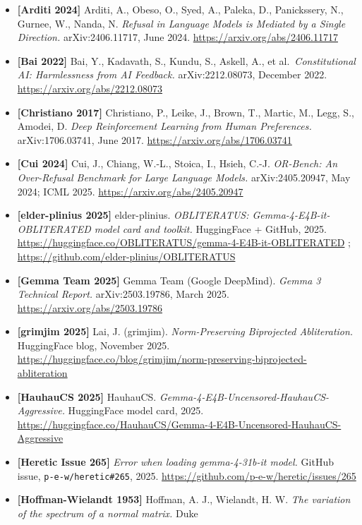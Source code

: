 \documentclass[
  11pt,
]{article}
\begin{document}
\begin{itemize}
\item
  \textbf{{[}Arditi 2024{]}} Arditi, A., Obeso, O., Syed, A., Paleka,
  D., Panickssery, N., Gurnee, W., Nanda, N. \emph{Refusal in Language
  Models is Mediated by a Single Direction.} arXiv:2406.11717, June
  2024. \url{https://arxiv.org/abs/2406.11717}
\item
  \textbf{{[}Bai 2022{]}} Bai, Y., Kadavath, S., Kundu, S., Askell, A.,
  et al.~\emph{Constitutional AI: Harmlessness from AI Feedback.}
  arXiv:2212.08073, December 2022.
  \url{https://arxiv.org/abs/2212.08073}
\item
  \textbf{{[}Christiano 2017{]}} Christiano, P., Leike, J., Brown, T.,
  Martic, M., Legg, S., Amodei, D. \emph{Deep Reinforcement Learning
  from Human Preferences.} arXiv:1706.03741, June 2017.
  \url{https://arxiv.org/abs/1706.03741}
\item
  \textbf{{[}Cui 2024{]}} Cui, J., Chiang, W.-L., Stoica, I., Hsieh,
  C.-J. \emph{OR-Bench: An Over-Refusal Benchmark for Large Language
  Models.} arXiv:2405.20947, May 2024; ICML 2025.
  \url{https://arxiv.org/abs/2405.20947}
\item
  \textbf{{[}elder-plinius 2025{]}} elder-plinius. \emph{OBLITERATUS:
  Gemma-4-E4B-it-OBLITERATED model card and toolkit.} HuggingFace +
  GitHub, 2025.
  \url{https://huggingface.co/OBLITERATUS/gemma-4-E4B-it-OBLITERATED} ;
  \url{https://github.com/elder-plinius/OBLITERATUS}
\item
  \textbf{{[}Gemma Team 2025{]}} Gemma Team (Google DeepMind).
  \emph{Gemma 3 Technical Report.} arXiv:2503.19786, March 2025.
  \url{https://arxiv.org/abs/2503.19786}
\item
  \textbf{{[}grimjim 2025{]}} Lai, J. (grimjim). \emph{Norm-Preserving
  Biprojected Abliteration.} HuggingFace blog, November 2025.
  \url{https://huggingface.co/blog/grimjim/norm-preserving-biprojected-abliteration}
\item
  \textbf{{[}HauhauCS 2025{]}} HauhauCS.
  \emph{Gemma-4-E4B-Uncensored-HauhauCS-Aggressive.} HuggingFace model
  card, 2025.
  \url{https://huggingface.co/HauhauCS/Gemma-4-E4B-Uncensored-HauhauCS-Aggressive}
\item
  \textbf{{[}Heretic Issue 265{]}} \emph{Error when loading
  gemma-4-31b-it model.} GitHub issue, \texttt{p-e-w/heretic\#265},
  2025. \url{https://github.com/p-e-w/heretic/issues/265}
\item
  \textbf{{[}Hoffman-Wielandt 1953{]}} Hoffman, A. J., Wielandt, H. W.
  \emph{The variation of the spectrum of a normal matrix.} Duke

\end{itemize}
\end{document}
